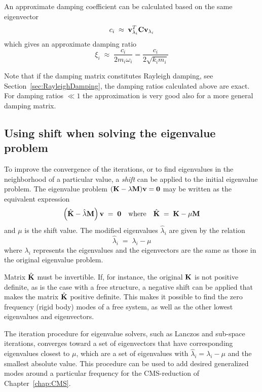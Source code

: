 An approximate damping coefficient can be calculated based on the
same eigenvector
%
\begin{equation}
c_i \;\approx\; {\bf v}_{\lambda_i}^T {\bf C}{\bf v}_{\lambda_i}
\label{eq:approxDampingCoeff}
\end{equation}
%
which gives an approximate damping ratio
%
\begin{equation}
\xi_i \;\approx\; \frac{c_i}{2 m_i \omega_i} = \frac{c_i}{2\sqrt{k_i m_i}}
\end{equation}

Note that if the damping matrix constitutes Rayleigh damping, see
Section~\ref{sec:RayleighDamping}, the damping ratios calculated above are exact.
For damping ratios $\ll 1$ the approximation is very good
also for a more general damping matrix.


\subsection{Using shift when solving the eigenvalue problem}

To improve the convergence of the iterations, or to find eigenvalues in the
neighborhood of a particular value, a \textit{shift} can be applied to the
initial eigenvalue problem.
The eigenvalue problem $({\bf K} - \lambda {\bf M}){\bf v} = {\bf 0}$ may be
written as the equivalent expression
%
\begin{equation}
\left( \hat{\bf K} - \hat{\lambda}{\bf M} \right) {\bf v} \;=\; {\bf 0}
\quad\text{where}\quad
\hat{\bf K} \;=\; {\bf K} - \mu{\bf M}
\label{eqK25:21}
\end{equation}
%
and $\mu$ is the shift value.
The modified eigenvalues $\hat{\lambda}_i$ are given by the relation
%
\begin{equation}
\hat{\lambda}_i \;=\; \lambda_{i} - \mu
\end{equation}
%
where $\lambda_i$ represents the eigenvalues and  the eigenvectors are the same
as those in the original eigenvalue problem.

Matrix $\hat{\bf K}$ must be invertible.
If, for instance, the original $\bf K$ is not positive definite, as is the case
with a free structure, a negative shift can be applied that makes the matrix
$\hat{\bf K}$ positive definite.
This makes it possible to find the zero frequency (rigid body) modes of a free
system, as well as the other lowest eigenvalues and eigenvectors.

The iteration procedure for eigenvalue solvers, such as Lanczos and sub-space
iterations, converges toward a set of eigenvectors that have corresponding
eigenvalues closest to $\mu$, which are a set of eigenvalues with
$\hat{\lambda}_i=\lambda_i-\mu$ and the smallest absolute value.
This procedure can be used to add desired generalized modes around a particular
frequency for the CMS-reduction of Chapter~\ref{chap:CMS}.
